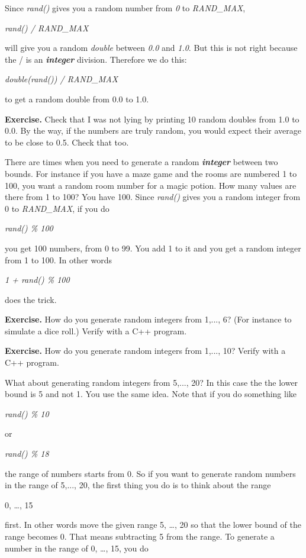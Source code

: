 \documentclass[
]{article}
\begin{document}
Since \emph{rand()} gives you a random number from \emph{0} to
\emph{RAND\_MAX},

\emph{rand() / RAND\_MAX}

will give you a random \emph{double} between \emph{0.0} and \emph{1.0}.
But this is not right because the / is an \emph{\textbf{integer}}
division. Therefore we do this:

\emph{double(rand()) / RAND\_MAX}

to get a random double from 0.0 to 1.0.

\textbf{Exercise.} Check that I was not lying by printing 10 random
doubles from 1.0 to 0.0. By the way, if the numbers are truly random,
you would expect their average to be close to 0.5. Check that too.

There are times when you need to generate a random
\emph{\textbf{integer}} between two bounds. For instance if you have a
maze game and the rooms are numbered 1 to 100, you want a random room
number for a magic potion. How many values are there from 1 to 100? You
have 100. Since \emph{rand()} gives you a random integer from 0 to
\emph{RAND\_MAX}, if you do

\emph{rand() \% 100}

you get 100 numbers, from 0 to 99. You add 1 to it and you get a random
integer from 1 to 100. In other words

\emph{1 + rand() \% 100}

does the trick.

\textbf{Exercise.} How do you generate random integers from 1,..., 6?
(For instance to simulate a dice roll.) Verify with a C++ program.

\textbf{Exercise.} How do you generate random integers from 1,..., 10?
Verify with a C++ program.

What about generating random integers from 5,..., 20? In this case the
the lower bound is 5 and not 1. You use the same idea. Note that if you
do something like

\emph{rand() \% 10}

or

\emph{rand() \% 18}

the range of numbers starts from 0. So if you want to generate random
numbers in the range of 5,..., 20, the first thing you do is to think
about the range

0, \ldots, 15

first. In other words move the given range 5, \ldots, 20 so that the
lower bound of the range becomes 0. That means subtracting 5 from the
range. To generate a number in the range of 0, \ldots, 15, you do
\end{document}
